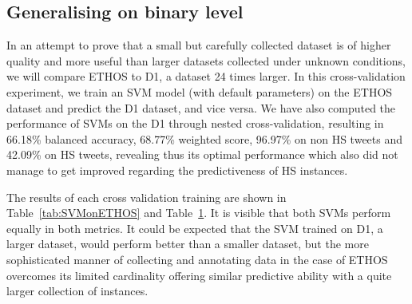 \documentclass{article}
\begin{document}
\subsection{Generalising on binary level}

In an attempt to prove that a small but carefully collected dataset is of higher quality and more useful than larger datasets collected under unknown conditions, we will compare ETHOS to D1, a dataset 24 times larger. In this cross-validation experiment, we train an SVM model (with default parameters) on the ETHOS dataset and predict the D1 dataset, and vice versa. We have also computed the performance of SVMs on the D1 through nested cross-validation, resulting in 66.18\% balanced accuracy, 68.77\%  weighted score, 96.97\%  on non HS tweets and 42.09\% on HS tweets, revealing thus its optimal performance which also did not manage to get improved regarding the predictiveness of HS instances.

The results of each cross validation training are shown in Table~\ref{tab:SVMonETHOS} and Table~\ref{tab:SVMonD1}. It is visible that both SVMs perform equally in both metrics. It could be expected that the SVM trained on D1, a larger dataset, would perform better than a smaller dataset, but the more sophisticated manner of collecting and annotating data in the case of ETHOS overcomes its limited cardinality offering similar predictive ability with a quite larger collection of instances.

\begin{figure}[ht]
\centering
{}
\centering
{}
\label{tab:SVMonETHOS}
\endminipage\hfill
{}
\centering
{}
\label{tab:SVMonD1}
\endminipage
\end{figure}
\end{document}
